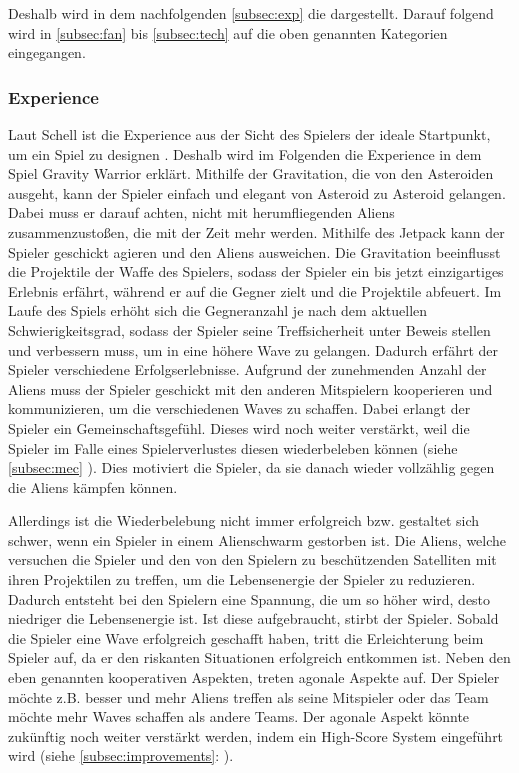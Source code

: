 \documentclass[11pt]{scrartcl}
\begin{document}
Deshalb wird in dem nachfolgenden \autoref{subsec:exp} die  dargestellt. Darauf folgend wird in \ref{subsec:fan} bis \ref{subsec:tech} auf die oben genannten Kategorien eingegangen.

\subsubsection{Experience}
\label{subsec:exp}
Laut Schell ist die Experience aus der Sicht des Spielers der ideale Startpunkt, um ein Spiel zu designen \cite[~p. xxiii]{S2014}. Deshalb wird im Folgenden die Experience in dem Spiel Gravity Warrior erklärt. 
Mithilfe der Gravitation, die von den Asteroiden ausgeht, kann der Spieler einfach und elegant von Asteroid zu Asteroid gelangen. Dabei muss er darauf achten, nicht mit herumfliegenden Aliens zusammenzustoßen, die mit der Zeit mehr werden. Mithilfe des Jetpack kann der Spieler geschickt agieren und den Aliens ausweichen. Die Gravitation beeinflusst die Projektile der Waffe des Spielers, sodass der Spieler ein bis jetzt einzigartiges Erlebnis erfährt, während er auf die Gegner zielt und die Projektile abfeuert. Im Laufe des Spiels erhöht sich die Gegneranzahl je nach dem aktuellen Schwierigkeitsgrad, sodass der Spieler seine Treffsicherheit unter Beweis stellen und verbessern muss, um in eine höhere Wave zu gelangen. Dadurch erfährt der Spieler verschiedene Erfolgserlebnisse. 
Aufgrund der zunehmenden Anzahl der Aliens muss der Spieler geschickt mit den anderen Mitspielern kooperieren und kommunizieren, um die verschiedenen Waves zu schaffen. Dabei erlangt der Spieler ein Gemeinschaftsgefühl. Dieses wird noch weiter verstärkt, weil die Spieler im Falle eines Spielerverlustes diesen wiederbeleben können (siehe \autoref{subsec:mec} ). Dies motiviert die Spieler, da sie danach wieder vollzählig gegen die Aliens kämpfen können. 

Allerdings ist die Wiederbelebung nicht immer erfolgreich bzw. gestaltet sich schwer, wenn ein Spieler in einem Alienschwarm gestorben ist. Die Aliens, welche versuchen die Spieler und den von den Spielern zu beschützenden Satelliten mit ihren Projektilen zu treffen, um die Lebensenergie der Spieler zu reduzieren. Dadurch entsteht bei den Spielern eine Spannung, die um so höher wird, desto niedriger die Lebensenergie ist. Ist diese aufgebraucht, stirbt der Spieler. Sobald die Spieler eine Wave erfolgreich geschafft haben, tritt die Erleichterung beim Spieler auf, da er den riskanten Situationen erfolgreich entkommen ist. Neben den eben genannten kooperativen Aspekten, treten agonale Aspekte auf. Der Spieler möchte z.B. besser und mehr Aliens treffen als seine Mitspieler oder das Team möchte mehr Waves schaffen als andere Teams. Der agonale Aspekt könnte zukünftig noch weiter verstärkt werden, indem ein High-Score System eingeführt wird (siehe \autoref{subsec:improvements}: ). 
\end{document}
